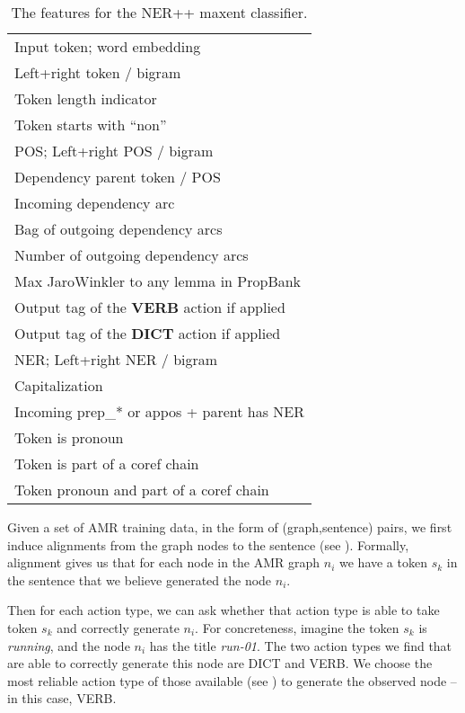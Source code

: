 \documentclass[11pt]{article}
\newcommand\w[1]{\textit{#1}} %
\newcommand\n[1]{\textit{#1}} %
\begin{document}
\begin{table}[t]
\small
\begin{center}
\begin{tabular}{l}
Input token; word embedding                  \\
Left+right token / bigram                    \\
Token length indicator     \\
Token starts with ``non''     \\
POS; Left+right POS / bigram                 \\
Dependency parent token / POS                \\
Incoming dependency arc                      \\
Bag of outgoing dependency arcs              \\
Number of outgoing dependency arcs           \\
Max JaroWinkler to any lemma in PropBank      \\
Output tag of the \textbf{VERB} action if applied \\
Output tag of the \textbf{DICT} action if applied \\
NER; Left+right NER / bigram                 \\
Capitalization                               \\
Incoming prep\_* or appos + parent has NER   \\
Token is pronoun                             \\
Token is part of a coref chain               \\
Token pronoun and part of a coref chain     \\
\end{tabular}
\end{center}
\caption{\label{tab:features} The features for the NER++ maxent classifier. }
\end{table}

Given a set of AMR training data, in the form of (graph,sentence) pairs,
  we first induce alignments from the graph nodes to the sentence 
  (see ).
Formally, alignment gives us that for each node in the AMR graph $n_i$ we have a token $s_k$ in the
  sentence that we believe generated the node $n_i$.

Then for each action type, we can ask whether that action type is able to take 
  token $s_k$ and correctly generate $n_i$. 
For concreteness, imagine the token $s_k$ is \w{running}, and the node $n_i$ has 
  the title \n{run-01}.
The two action types we find that are 
  able to correctly generate this node are DICT and VERB. 
We choose the most reliable action type of those available (see )
  to generate the observed node -- in this case, VERB.
  
\end{document}
